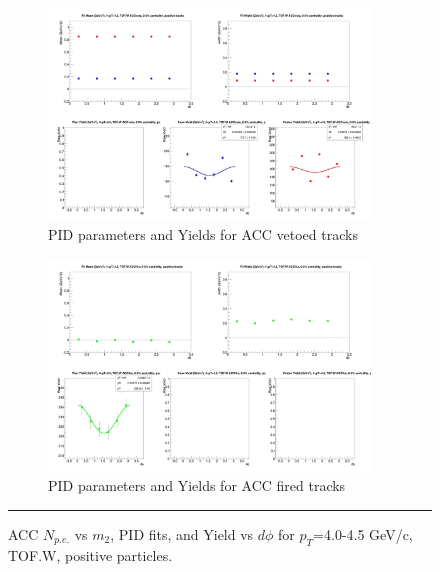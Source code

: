 \begin{figure}[H]
  \ContinuedFloat
    \vspace*{-1cm}
    \begin{subfigure}{1\textwidth}
   \centering
   \includegraphics[width=0.94\textwidth]{hiptfits/pos/fitParams_tof2_cent0_ch1_pT-40-45.jpg}
    \caption{PID parameters and Yields for ACC vetoed tracks}
    \end{subfigure}    
    \begin{subfigure}{1\textwidth}
   \centering
   \includegraphics[width=0.94\textwidth]{hiptfits/pos/fitParams_tof3_cent0_ch1_pT-40-45.jpg}
    \caption{PID parameters and Yields for ACC fired tracks}
    \end{subfigure} 
    \rule{35em}{0.5pt}
  \caption[ACC $N_{p.e.}$ vs $m_2$, PID fits, and Yield vs $d\phi$ for $p_T$=4.0-4.5 GeV/c, TOF.W, positive particles.]{ACC $N_{p.e.}$ vs $m_2$, PID fits, and Yield vs $d\phi$ for $p_T$=4.0-4.5 GeV/c, TOF.W, positive particles.}
  \label{fig:acc40-45pos}
\end{figure}
